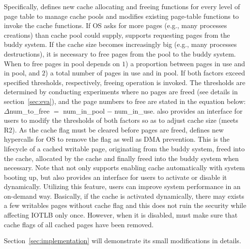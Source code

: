 Specifically, \name defines new cache allocating and freeing functions for every level of page table to manage cache pools and modifies existing page-table functions to invoke the cache functions. If OS asks for more pages (e.g., many processes creations) than cache pool could supply, \name supports requesting pages from the buddy system. If the cache size becomes increasingly big (e.g., many processes destructions), it is necessary to free pages from the pool to the buddy system. When to free pages in pool depends on $1$) a proportion between pages in use and in pool, and $2$) a total number of pages in use and in pool. If both factors exceed specified thresholds, respectively, freeing operation is invoked. The thresholds are determined by conducting experiments where no pages are freed (see details in section~\ref{sec:eva}), and the page numbers to free are stated in the equation below: $\Delta$num\_to\_free $=$ num\_in\_pool $-$ num\_in\_use. \name also provides an interface for users to modify the thresholds of both factors so as to adjust cache size (meets R2). As the cache flag must be cleared before pages are freed, \name defines new hypercalls for OS to remove the flag as well as DMA prevention. This is the lifecycle of a cached writable page, originating from the buddy system, freed into the cache, allocated by the cache and finally freed into the buddy system when necessary. Note that \name not only supports enabling cache automatically with system booting up, but also provides an interface for users to activate or disable it dynamically. Utilizing this feature, users can improve system performance in an on-demand way. Basically, if the cache is activated dynamically, there may exists a few writables pages without cache flag and this does not ruin the security while affecting IOTLB only once. However, when it is disabled, \name must make sure that cache flags of all cached pages have been removed.

Section~\ref{sec:implementation} will demonstrate its small modifications in details.
